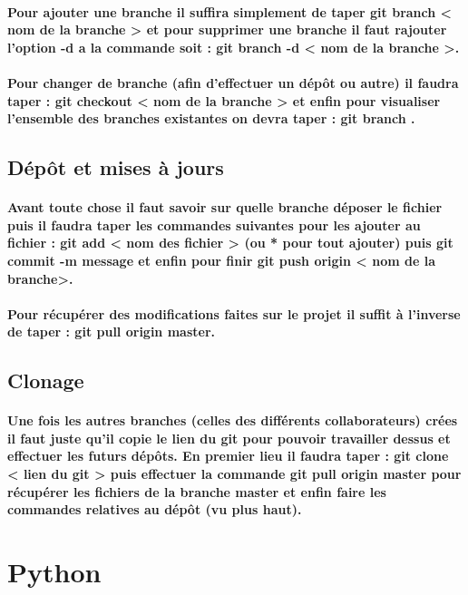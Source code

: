 \documentclass[a4paper, 12pt, twoside]{article}
\begin{document}
\paragraph{Pour ajouter une branche il suffira simplement de taper  git branch < nom de la branche >  et pour supprimer une branche il faut rajouter
l'option -d a la commande soit :  git branch -d < nom de la branche >.}
\paragraph{  Pour changer de branche (afin d'effectuer un dépôt ou autre) il faudra taper :  git checkout < nom de la branche >   et enfin pour visualiser
l'ensemble des branches existantes on devra taper :  git branch .}
\subsection{Dépôt et mises à jours}
\paragraph{ Avant toute chose il faut savoir sur quelle branche déposer le fichier puis il faudra taper les commandes suivantes pour les ajouter 
au fichier :  git add < nom des fichier >  (ou * pour tout ajouter) puis  git commit -m message  et enfin pour finir git push origin < nom de la branche>.}
\paragraph{Pour récupérer des modifications faites sur le projet il suffit à l'inverse de taper : 
 git pull origin master.}
\subsection{Clonage}
\paragraph{Une fois les autres branches (celles des différents collaborateurs) crées il faut juste qu'il copie le lien du git pour pouvoir 
travailler dessus et effectuer les futurs dépôts. En premier lieu il faudra taper :  git clone < lien du git >  puis effectuer la commande
 git pull origin master  pour récupérer les fichiers de la branche master et enfin faire les commandes relatives au dépôt (vu plus haut).}



\section{Python}
\end{document}
